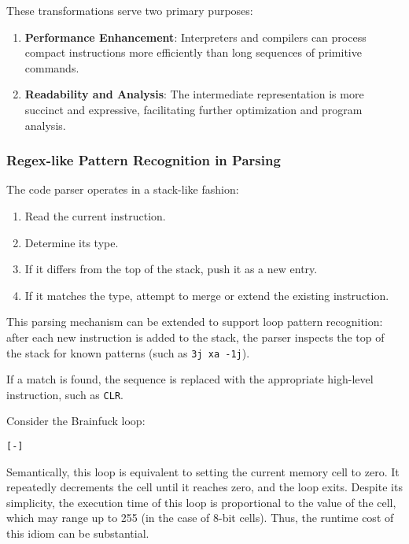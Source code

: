 \par These transformations serve two primary purposes:

\begin{enumerate}
    \item \textbf{Performance Enhancement}: Interpreters and compilers can process compact instructions more efficiently than long sequences of primitive commands.
    \item \textbf{Readability and Analysis}: The intermediate representation is more succinct and expressive, facilitating further optimization and program analysis.
\end{enumerate}

\subsubsection*{Regex-like Pattern Recognition in Parsing}

\par The code parser operates in a stack-like fashion:

\begin{enumerate}
    \item Read the current instruction.
    \item Determine its type.
    \item If it differs from the top of the stack, push it as a new entry.
    \item If it matches the type, attempt to merge or extend the existing instruction.
\end{enumerate}

\par This parsing mechanism can be extended to support loop pattern recognition: after each new instruction is added to the stack, the parser inspects the top of the stack for known patterns (such as \texttt{3j xa -1j}).

\par If a match is found, the sequence is replaced with the appropriate high-level instruction, such as \texttt{CLR}.
\par Consider the Brainfuck loop:

\begin{verbatim}
[-]
\end{verbatim}

\par Semantically, this loop is equivalent to setting the current memory cell to zero. It repeatedly decrements the cell until it reaches zero, and the loop exits. Despite its simplicity, the execution time of this loop is proportional to the value of the cell, which may range up to 255 (in the case of 8-bit cells). Thus, the runtime cost of this idiom can be substantial.

